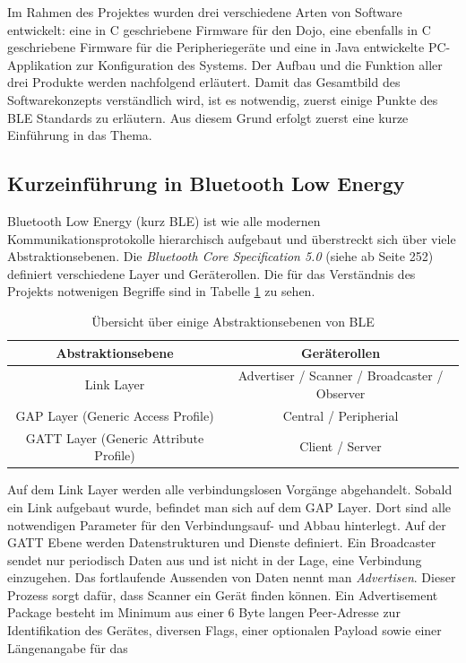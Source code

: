 Im Rahmen des Projektes wurden drei verschiedene Arten von Software entwickelt: 
eine in C geschriebene Firmware für den Dojo, eine ebenfalls in C geschriebene Firmware für die Peripheriegeräte und eine in Java entwickelte PC-Applikation zur Konfiguration des Systems. 
Der Aufbau und die Funktion aller drei Produkte werden nachfolgend erläutert.
Damit das Gesamtbild des Softwarekonzepts verständlich wird, ist es notwendig, zuerst einige Punkte des BLE Standards zu erläutern. 
Aus diesem Grund erfolgt zuerst eine kurze Einführung in das Thema.

\subsection{Kurzeinführung in Bluetooth Low Energy}
Bluetooth Low Energy (kurz BLE) ist wie alle modernen Kommunikationsprotokolle hierarchisch aufgebaut und überstreckt sich über viele Abstraktionsebenen. 
Die \textit{Bluetooth Core Specification 5.0} (siehe \cite{BLE_SPEC} ab Seite 252) definiert verschiedene Layer und Geräterollen. 
Die für das Verständnis des Projekts notwenigen Begriffe sind in Tabelle \ref{tab:BLE} zu sehen.
\begin{table}[h]
  \centering
  \begin{tabular}{|c|c|}
    \hline
    \textbf{Abstraktionsebene} & \textbf{Geräterollen}\\
    \hline
    Link Layer & Advertiser / Scanner / Broadcaster / Observer \\
    \hline
    GAP Layer (Generic Access Profile) & Central / Peripherial \\
    \hline
    GATT Layer (Generic Attribute Profile) & Client / Server \\
    \hline
  \end{tabular}
  \caption{Übersicht über einige Abstraktionsebenen von BLE}\label{tab:BLE}
\end{table}
Auf dem Link Layer werden alle verbindungslosen Vorgänge abgehandelt. Sobald ein Link aufgebaut wurde, 
befindet man sich auf dem GAP Layer. Dort sind alle notwendigen Parameter für den Verbindungsauf- und 
Abbau hinterlegt. Auf der GATT Ebene werden Datenstrukturen und Dienste definiert. 
Ein Broadcaster sendet nur periodisch Daten aus und ist nicht in der Lage, eine Verbindung einzugehen. 
Das fortlaufende Aussenden von Daten nennt man \textit{Advertisen}. Dieser Prozess sorgt dafür, dass Scanner ein
Gerät finden können. Ein Advertisement Package besteht im Minimum aus einer 6 Byte langen Peer-Adresse 
zur Identifikation des Gerätes, diversen Flags, einer optionalen Payload sowie einer Längenangabe für das
